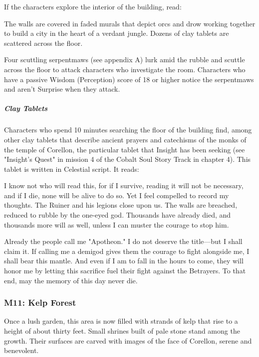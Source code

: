 \documentclass[10pt,a4paper,twoside,fancy,bg=print,twocolumn,openany,nodeprecatedcode]{dndbook}
\begin{document}
If the characters explore the interior of the building, read:

\begin{DndReadAloud}{}
The walls are covered in faded murals that depict orcs and drow working together to build a city in the heart of a verdant jungle. Dozens of clay tablets are scattered across the floor.

\end{DndReadAloud}

Four scuttling serpentmaws (see appendix A) lurk amid the rubble and scuttle across the floor to attack characters who investigate the room. Characters who have a passive Wisdom (Perception) score of 18 or higher notice the serpentmaws and aren't Surprise when they attack.

\subparagraph{Clay Tablets}
Characters who spend 10 minutes searching the floor of the building find, among other clay tablets that describe ancient prayers and catechisms of the monks of the temple of Corellon, the particular tablet that Insight has been seeking (see "Insight's Quest" in mission 4 of the Cobalt Soul Story Track in chapter 4). This tablet is written in Celestial script. It reads:

\begin{DndReadAloud}{}
I know not who will read this, for if I survive, reading it will not be necessary, and if I die, none will be alive to do so. Yet I feel compelled to record my thoughts. The Ruiner and his legions close upon us. The walls are breached, reduced to rubble by the one-eyed god. Thousands have already died, and thousands more will as well, unless I can muster the courage to stop him.

Already the people call me "Apotheon." I do not deserve the title—but I shall claim it. If calling me a demigod gives them the courage to fight alongside me, I shall bear this mantle. And even if I am to fall in the hours to come, they will honor me by letting this sacrifice fuel their fight against the Betrayers. To that end, may the memory of this day never die.

\end{DndReadAloud}

\subsubsection{M11: Kelp Forest}
\begin{DndReadAloud}{}
Once a lush garden, this area is now filled with strands of kelp that rise to a height of about thirty feet. Small shrines built of pale stone stand among the growth. Their surfaces are carved with images of the face of Corellon, serene and benevolent.

\end{DndReadAloud}
\end{document}
